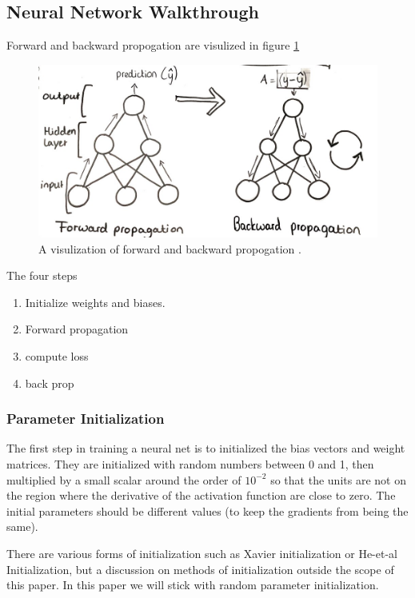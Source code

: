 \documentclass[12pt]{article}
\begin{document}
	
	\subsection{Neural Network Walkthrough}
	
	Forward and backward propogation are visulized in figure \ref{fig:forwardbackwardprop}
	\begin{figure}
		\centering
		\includegraphics[width=0.7\linewidth]{forwardBackwardProp}
		\caption{A visulization of forward and backward propogation \cite{nnBlog}.}
		\label{fig:forwardbackwardprop}
	\end{figure}

	The four steps
	\begin{enumerate}\singlespacing
		\item Initialize weights and biases. 
		\item Forward propagation
		\item compute loss
		\item back prop
	\end{enumerate}%
	\subsubsection{Parameter Initialization}
	The first step in training a neural net is to initialized the bias vectors and weight  matrices. They are initialized with random numbers between 0 and 1, then multiplied by a small scalar around the order of $10^{-2}$ so that the units are not on the region where the derivative of the activation function are close to zero. The initial parameters should be different values (to keep the gradients from being the same).
	
	There are various forms of initialization such as Xavier initialization or He-et-al Initialization, but a discussion on methods of initialization outside the scope of this paper. In this paper we will stick with random parameter initialization. 
	
	
\end{document}
